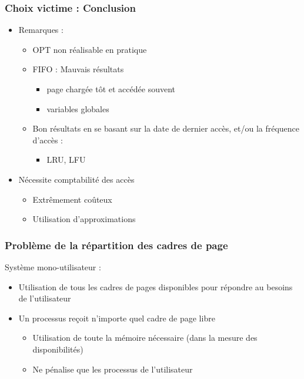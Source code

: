 \begin{frame}
\frametitle{Choix victime : Conclusion}
\begin{itemize}
\item Remarques :
\begin{itemize}
\item OPT non réalisable en pratique
\item FIFO : Mauvais résultats 
\begin{itemize}
\item page chargée tôt et accédée souvent
\item variables globales
\end{itemize}

\item Bon résultats en se basant sur la date de dernier accès, et/ou la fréquence d'accès :
\begin{itemize}
\item LRU, LFU
\end{itemize}
\end{itemize}
\item Nécessite comptabilité des accès
\begin{itemize}
\item Extrêmement coûteux
\item Utilisation d'approximations
\end{itemize}
\end{itemize}
\end{frame}


\begin{frame}
\frametitle{Problème de la répartition des cadres de page}
Système mono-utilisateur :
\begin{itemize}
\item Utilisation de tous les cadres de pages disponibles pour répondre au besoins de l'utilisateur
\item Un processus reçoit n'importe quel cadre de page libre
\begin{itemize}
\item Utilisation de toute la mémoire nécessaire (dans la mesure des disponibilités)
\item Ne pénalise que les processus de l'utilisateur
\end{itemize}
\end{itemize}
\end{frame}


